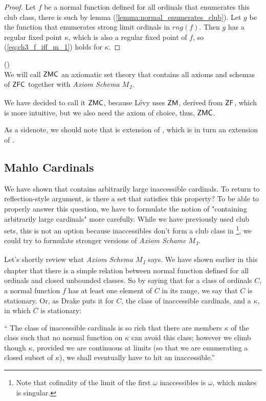 \begin{proof}
Let $f$ be a normal function defined for all ordinals that enumerates this club class, there is such by lemma (\ref{lemma:normal_enumerates_club}). %
Let $g$ be the function that enumerates strong limit ordinals in $rng(f)$. %
Then $g$ has a regular fixed point $\kappa$, which is also a regular fixed point of $f$, so (\ref{eq:ch3_f_iff_m_1}) holds for $\kappa$.

% 
\end{proof}

\begin{definition}{()}\\
We will call $\sf{ZMC}$ an axiomatic set theory that contains all axioms and schemas of $\sf{ZFC}$ together with \emph{Axiom Schema $M$\textsubscript{1}}.
\end{definition}
We have decided to call it $\sf{ZMC}$, because Lévy uses $\sf{ZM}$, derived from $\sf{ZF}$, which is more intuitive, but we also need the axiom of choice, thus, $\sf{ZMC}$.

As a sidenote, we should note that  is extension of , which is in turn an extension of .

\subsection{Mahlo Cardinals}
We have shown that  contains arbitrarily large inaccessible cardinals. To return to reflection-style argument, is there a set that satisfies this property? To be able to properly answer this question, we have to formulate the notion of "containing arbitrarily large cardinals" more carefully. While we have previously used club sets, this is not an option because inaccessibles don't form a club class in \footnote{Note that cofinality of the limit of the first $\omega$ inaccessibles is $\omega$, which makes is singular.}, we could try to formulate stronger versions of \emph{Axiom Schame $M$\textsubscript{1}}. 

Let's shortly review what \emph{Axiom Schema $M$\textsubscript{1}} says. We have shown earlier in this chapter that there is a simple relation between normal function defined for all ordinals and closed unbounded classes. So by saying that for a class of ordinals $C$, a normal function $f$ has at least one element of $C$ in its range, we say that $C$ is stationary. Or, as Drake puts it for $C$, the class of inaccessible cardinals, and a $\kappa$, in which $C$ is stationary:
\begin{displayquote}
`` The class of inaccessible cardinals is so rich that there are members $\kappa$ of the class such that no normal function on $\kappa$ can avoid this class; however we climb though $\kappa$, provided we are continuous at limits (so that we are enumerating a closed subset of $\kappa$), we shall eventually have to hit an inaccessible.''
\end{displayquote}

